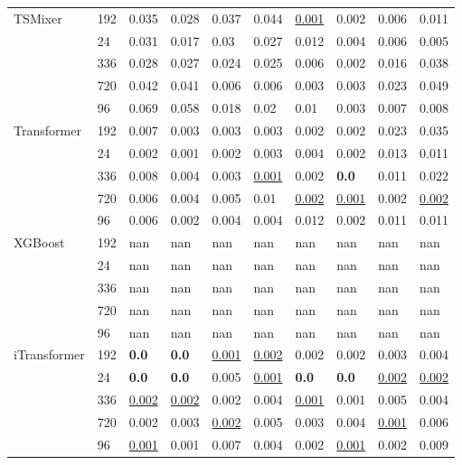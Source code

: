 \begin{tabular}{llllllllll}
\cline{1-10}
\multirow[t]{5}{*}{TSMixer} & 192 & 0.035 & 0.028 & 0.037 & 0.044 & \underline{0.001} & 0.002 & 0.006 & 0.011 \\
 & 24 & 0.031 & 0.017 & 0.03 & 0.027 & 0.012 & 0.004 & 0.006 & 0.005 \\
 & 336 & 0.028 & 0.027 & 0.024 & 0.025 & 0.006 & 0.002 & 0.016 & 0.038 \\
 & 720 & 0.042 & 0.041 & 0.006 & 0.006 & 0.003 & 0.003 & 0.023 & 0.049 \\
 & 96 & 0.069 & 0.058 & 0.018 & 0.02 & 0.01 & 0.003 & 0.007 & 0.008 \\
\cline{1-10}
\multirow[t]{5}{*}{Transformer} & 192 & 0.007 & 0.003 & 0.003 & 0.003 & 0.002 & 0.002 & 0.023 & 0.035 \\
 & 24 & 0.002 & 0.001 & 0.002 & 0.003 & 0.004 & 0.002 & 0.013 & 0.011 \\
 & 336 & 0.008 & 0.004 & 0.003 & \underline{0.001} & 0.002 & \textbf{0.0} & 0.011 & 0.022 \\
 & 720 & 0.006 & 0.004 & 0.005 & 0.01 & \underline{0.002} & \underline{0.001} & 0.002 & \underline{0.002} \\
 & 96 & 0.006 & 0.002 & 0.004 & 0.004 & 0.012 & 0.002 & 0.011 & 0.011 \\
\cline{1-10}
\multirow[t]{5}{*}{XGBoost} & 192 & nan & nan & nan & nan & nan & nan & nan & nan \\
 & 24 & nan & nan & nan & nan & nan & nan & nan & nan \\
 & 336 & nan & nan & nan & nan & nan & nan & nan & nan \\
 & 720 & nan & nan & nan & nan & nan & nan & nan & nan \\
 & 96 & nan & nan & nan & nan & nan & nan & nan & nan \\
\cline{1-10}
\multirow[t]{5}{*}{iTransformer} & 192 & \textbf{0.0} & \textbf{0.0} & \underline{0.001} & \underline{0.002} & 0.002 & 0.002 & 0.003 & 0.004 \\
 & 24 & \textbf{0.0} & \textbf{0.0} & 0.005 & \underline{0.001} & \textbf{0.0} & \textbf{0.0} & \underline{0.002} & \underline{0.002} \\
 & 336 & \underline{0.002} & \underline{0.002} & 0.002 & 0.004 & \underline{0.001} & 0.001 & 0.005 & 0.004 \\
 & 720 & 0.002 & 0.003 & \underline{0.002} & 0.005 & 0.003 & 0.004 & \underline{0.001} & 0.006 \\
 & 96 & \underline{0.001} & 0.001 & 0.007 & 0.004 & 0.002 & \underline{0.001} & 0.002 & 0.009 \\
\cline{1-10}
\bottomrule
\end{tabular}
